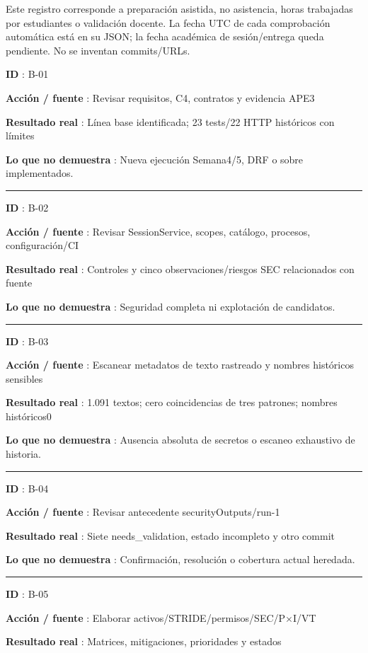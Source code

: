 \documentclass[12pt,a4paper]{report}
\begin{document}
Este registro corresponde a preparación asistida, no asistencia, horas
trabajadas por estudiantes o validación docente. La fecha UTC de cada
comprobación automática está en su JSON; la fecha académica de
sesión/entrega queda pendiente. No se inventan commits/URLs.

\textbf{ID }: B-01

\textbf{Acción / fuente }: Revisar requisitos, C4, contratos y evidencia
APE3

\textbf{Resultado real }: Línea base identificada; 23 tests/22 HTTP
históricos con límites

\textbf{Lo que no demuestra }: Nueva ejecución Semana4/5, DRF o sobre
implementados.

\medskip\hrule\medskip

\textbf{ID }: B-02

\textbf{Acción / fuente }: Revisar SessionService, scopes, catálogo,
procesos, configuración/CI

\textbf{Resultado real }: Controles y cinco observaciones/riesgos SEC
relacionados con fuente

\textbf{Lo que no demuestra }: Seguridad completa ni explotación de
candidatos.

\medskip\hrule\medskip

\textbf{ID }: B-03

\textbf{Acción / fuente }: Escanear metadatos de texto rastreado y
nombres históricos sensibles

\textbf{Resultado real }: 1.091 textos; cero coincidencias de tres
patrones; nombres históricos0

\textbf{Lo que no demuestra }: Ausencia absoluta de secretos o escaneo
exhaustivo de historia.

\medskip\hrule\medskip

\textbf{ID }: B-04

\textbf{Acción / fuente }: Revisar antecedente securityOutputs/run-1

\textbf{Resultado real }: Siete needs\_validation, estado incompleto y
otro commit

\textbf{Lo que no demuestra }: Confirmación, resolución o cobertura
actual heredada.

\medskip\hrule\medskip

\textbf{ID }: B-05

\textbf{Acción / fuente }: Elaborar activos/STRIDE/permisos/SEC/P\ensuremath{\times}I/VT

\textbf{Resultado real }: Matrices, mitigaciones, prioridades y estados
\end{document}
